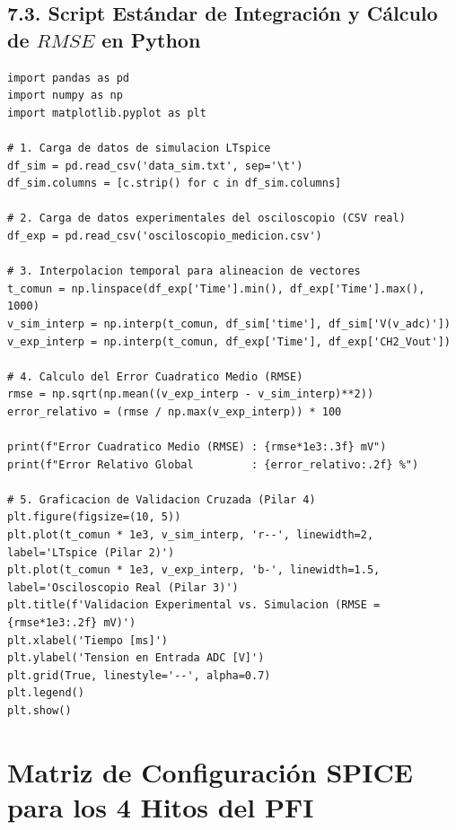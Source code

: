 \documentclass[11pt, a4paper]{article}
\begin{document}
\subsection{7.3. Script Estándar de Integración y Cálculo de $RMSE$ en Python}
\begin{lstlisting}[style=pythonstyle]
import pandas as pd
import numpy as np
import matplotlib.pyplot as plt

# 1. Carga de datos de simulacion LTspice
df_sim = pd.read_csv('data_sim.txt', sep='\t')
df_sim.columns = [c.strip() for c in df_sim.columns]

# 2. Carga de datos experimentales del osciloscopio (CSV real)
df_exp = pd.read_csv('osciloscopio_medicion.csv')

# 3. Interpolacion temporal para alineacion de vectores
t_comun = np.linspace(df_exp['Time'].min(), df_exp['Time'].max(), 1000)
v_sim_interp = np.interp(t_comun, df_sim['time'], df_sim['V(v_adc)'])
v_exp_interp = np.interp(t_comun, df_exp['Time'], df_exp['CH2_Vout'])

# 4. Calculo del Error Cuadratico Medio (RMSE)
rmse = np.sqrt(np.mean((v_exp_interp - v_sim_interp)**2))
error_relativo = (rmse / np.max(v_exp_interp)) * 100

print(f"Error Cuadratico Medio (RMSE) : {rmse*1e3:.3f} mV")
print(f"Error Relativo Global         : {error_relativo:.2f} %")

# 5. Graficacion de Validacion Cruzada (Pilar 4)
plt.figure(figsize=(10, 5))
plt.plot(t_comun * 1e3, v_sim_interp, 'r--', linewidth=2, label='LTspice (Pilar 2)')
plt.plot(t_comun * 1e3, v_exp_interp, 'b-', linewidth=1.5, label='Osciloscopio Real (Pilar 3)')
plt.title(f'Validacion Experimental vs. Simulacion (RMSE = {rmse*1e3:.2f} mV)')
plt.xlabel('Tiempo [ms]')
plt.ylabel('Tension en Entrada ADC [V]')
plt.grid(True, linestyle='--', alpha=0.7)
plt.legend()
plt.show()
\end{lstlisting}

\newpage
\section{Matriz de Configuración SPICE para los 4 Hitos del PFI}
\end{document}
